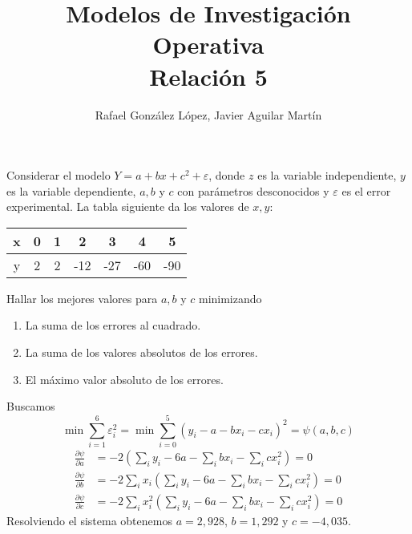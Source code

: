 \documentclass[twoside]{article}
\begin{document}
\title{Modelos de Investigación Operativa\\ Relación 5}
\author{Rafael González López, Javier Aguilar Martín}
\date{}
\maketitle

\begin{ejercicio}{1}Considerar el modelo $Y=a+bx+c^2+\varepsilon$, donde $z$ es la variable independiente, $y$ es la variable dependiente, $a,b$ y $c$ con parámetros desconocidos y $\varepsilon$ es el error experimental. La tabla siguiente da los valores de $x,y$:
\begin{center}
\begin{tabular}{|c|c|c|c|c|c|c|}
\hline
x & 0 &1 & 2 	& 3 	& 4 	& 5\\
\hline
y & 2 &2 	& -12 	& -27 & -60 &-90\\
\hline
\end{tabular}
\end{center}
Hallar los mejores valores para $a,b$ y $c$ minimizando
\begin{enumerate}
\item La suma de los errores al cuadrado.
\item La suma de los valores absolutos de los errores.
\item El máximo valor absoluto de los errores.
\end{enumerate}
\begin{solucion}
\begin{enumerate}
Buscamos 
$$
\min \sum_{i=1}^6 \varepsilon_i^2 = \min \sum_{i=0}^5(y_i -a-bx_i-c x_i)^2 = \psi(a,b,c)
$$
\begin{align*}
\frac{\partial \psi}{\partial a} &= -2\left(\sum_i y_i - 6a - \sum_i b x_i - \sum_i cx_i^2\right) = 0\\
\frac{\partial \psi}{\partial b} &= -2\sum_i x_i\left(\sum_i y_i - 6a - \sum_i b x_i - \sum_i cx_i^2\right) = 0\\
\frac{\partial \psi}{\partial c} &= -2\sum_i x_i^2\left(\sum_i y_i - 6a - \sum_i b x_i - \sum_i cx_i^2\right) = 0
\end{align*}
Resolviendo el sistema obtenemos $a=2,928$, $b=1,292$ y $c=-4,035$.
\end{enumerate}
\end{solucion}
\end{ejercicio}

\newpage 
\end{document}
